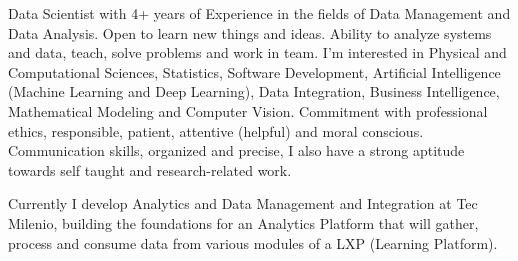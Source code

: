 %
%
%
\par{
Data Scientist with 4+ years of Experience in the fields of Data Management and Data Analysis. Open to learn new things and ideas. Ability to analyze systems and data, teach, solve problems and work in team. I’m interested in Physical and Computational Sciences, Statistics, Software Development, Artificial Intelligence (Machine Learning and Deep Learning), Data Integration, Business Intelligence, Mathematical Modeling and Computer Vision. Commitment with professional ethics, responsible, patient, attentive (helpful) and moral conscious. Communication skills, organized and precise, I also have a strong aptitude towards self taught and research-related work.

Currently I develop Analytics and Data Management and Integration at Tec Milenio, building the foundations for an Analytics Platform that will gather, process and consume data from various modules of a LXP (Learning Platform).
}